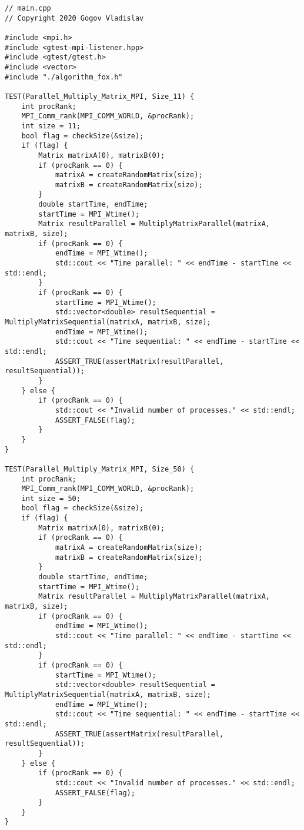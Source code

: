 \documentclass{report}
\begin{document}
\begin{lstlisting}
// main.cpp
// Copyright 2020 Gogov Vladislav

#include <mpi.h>
#include <gtest-mpi-listener.hpp>
#include <gtest/gtest.h>
#include <vector>
#include "./algorithm_fox.h"

TEST(Parallel_Multiply_Matrix_MPI, Size_11) {
    int procRank;
    MPI_Comm_rank(MPI_COMM_WORLD, &procRank);
    int size = 11;
    bool flag = checkSize(&size);
    if (flag) {
        Matrix matrixA(0), matrixB(0);
        if (procRank == 0) {
            matrixA = createRandomMatrix(size);
            matrixB = createRandomMatrix(size);
        }
        double startTime, endTime;
        startTime = MPI_Wtime();
        Matrix resultParallel = MultiplyMatrixParallel(matrixA, matrixB, size);
        if (procRank == 0) {
            endTime = MPI_Wtime();
            std::cout << "Time parallel: " << endTime - startTime << std::endl;
        }
        if (procRank == 0) {
            startTime = MPI_Wtime();
            std::vector<double> resultSequential = MultiplyMatrixSequential(matrixA, matrixB, size);
            endTime = MPI_Wtime();
            std::cout << "Time sequential: " << endTime - startTime << std::endl;
            ASSERT_TRUE(assertMatrix(resultParallel, resultSequential));
        }
    } else {
        if (procRank == 0) {
            std::cout << "Invalid number of processes." << std::endl;
            ASSERT_FALSE(flag);
        }
    }
}

TEST(Parallel_Multiply_Matrix_MPI, Size_50) {
    int procRank;
    MPI_Comm_rank(MPI_COMM_WORLD, &procRank);
    int size = 50;
    bool flag = checkSize(&size);
    if (flag) {
        Matrix matrixA(0), matrixB(0);
        if (procRank == 0) {
            matrixA = createRandomMatrix(size);
            matrixB = createRandomMatrix(size);
        }
        double startTime, endTime;
        startTime = MPI_Wtime();
        Matrix resultParallel = MultiplyMatrixParallel(matrixA, matrixB, size);
        if (procRank == 0) {
            endTime = MPI_Wtime();
            std::cout << "Time parallel: " << endTime - startTime << std::endl;
        }
        if (procRank == 0) {
            startTime = MPI_Wtime();
            std::vector<double> resultSequential = MultiplyMatrixSequential(matrixA, matrixB, size);
            endTime = MPI_Wtime();
            std::cout << "Time sequential: " << endTime - startTime << std::endl;
            ASSERT_TRUE(assertMatrix(resultParallel, resultSequential));
        }
    } else {
        if (procRank == 0) {
            std::cout << "Invalid number of processes." << std::endl;
            ASSERT_FALSE(flag);
        }
    }
}


\end{lstlisting}
\end{document}
